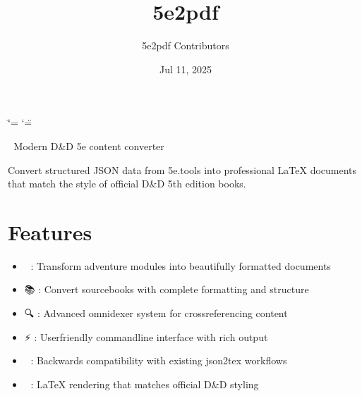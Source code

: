 \documentclass[letterpaper,10pt,english]{sphinxmanual}
\title{5e2pdf}
\date{Jul 11, 2025}
\author{5e2pdf Contributors}
\begin{document}
\ifdefined\shorthandoff
  \ifnum\catcode`\=\string=\active\shorthandoff{=}\fi
  \ifnum\catcode`\"=\active{}\fi
\fi

\pagestyle{empty}
\sphinxmaketitle
\pagestyle{plain}
\sphinxtableofcontents
\pagestyle{normal}
\label{\detokenize{index::doc}}


\sphinxAtStartPar
🎲  \sphinxhyphen{} Modern D\&D 5e content converter

\sphinxAtStartPar
Convert structured JSON data from 5e.tools into professional LaTeX documents
that match the style of official D\&D 5th edition books.




\chapter{Features}
\label{\detokenize{index:features}}\begin{itemize}
\item {} 
\sphinxAtStartPar
📖 : Transform adventure modules into beautifully formatted documents

\item {} 
\sphinxAtStartPar
📚 : Convert sourcebooks with complete formatting and structure

\item {} 
\sphinxAtStartPar
🔍 : Advanced omnidexer system for cross\sphinxhyphen{}referencing content

\item {} 
\sphinxAtStartPar
⚡ : User\sphinxhyphen{}friendly command\sphinxhyphen{}line interface with rich output

\item {} 
\sphinxAtStartPar
🔄 : Backwards compatibility with existing json2tex workflows

\item {} 
\sphinxAtStartPar
🎨 : LaTeX rendering that matches official D\&D styling

\end{itemize}
\end{document}
